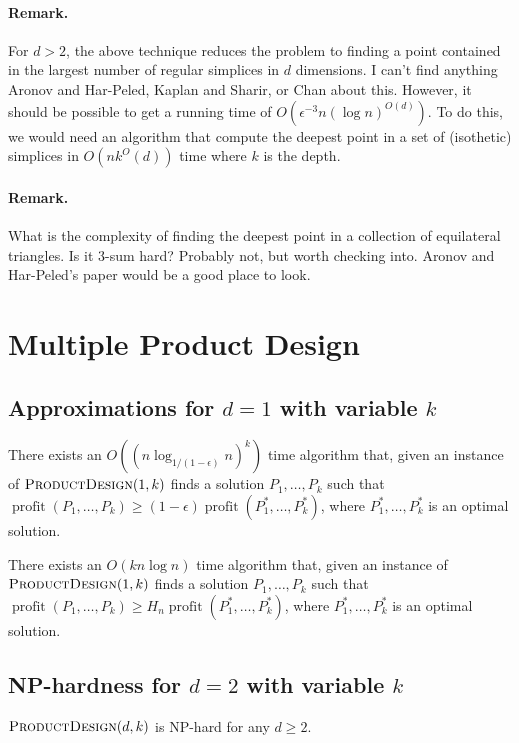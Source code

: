 \documentclass[lotsofwhite]{patmorin}
\newcommand{\val}{\operatorname{profit}}
\begin{document}
\paragraph{Remark.}

For $d>2$, the above technique reduces the problem to finding a point
contained in the largest number of regular simplices in $d$
dimensions.  I can't find anything Aronov and Har-Peled, Kaplan and
Sharir, or Chan about this.  However, it should be possible to get a
running time of $O(\epsilon^{-3}n(\log n)^{O(d)})$.  To do this, we
would need an algorithm that compute the deepest point in a set of
(isothetic) simplices in $O(n k^O(d))$ time where $k$ is the depth.

\paragraph{Remark.} What is the complexity of finding the deepest
point in a collection of equilateral triangles.  Is it 3-sum hard?
Probably not, but worth checking into.  Aronov and Har-Peled's paper
would be a good place to look.

\section{Multiple Product Design}

\subsection{Approximations for $d=1$ with variable $k$}

\begin{thm}
There exists an $O((n\log_{1/(1-\epsilon)} n)^k)$ time algorithm that,
given an instance of $\textsc{ProductDesign}(1,k)$ finds a solution
$P_1,\ldots,P_k$ such that $\val(P_1,\ldots,P_k) \ge
(1-\epsilon)\val(P_1^*,\ldots,P_k^*)$, where $P_1^*,\ldots,P_k^*$ is
an optimal solution.
\end{thm}


\begin{thm}
There exists an $O(kn\log n)$ time algorithm that,
given an instance of $\textsc{ProductDesign}(1,k)$ finds a solution
$P_1,\ldots,P_k$ such that $\val(P_1,\ldots,P_k) \ge
H_n\val(P_1^*,\ldots,P_k^*)$, where $P_1^*,\ldots,P_k^*$ is
an optimal solution.
\end{thm}

\subsection{NP-hardness for $d=2$ with variable $k$}

\begin{thm}
  $\textsc{ProductDesign}(d,k)$ is NP-hard for any $d\ge 2$.
\end{thm}
\end{document}
